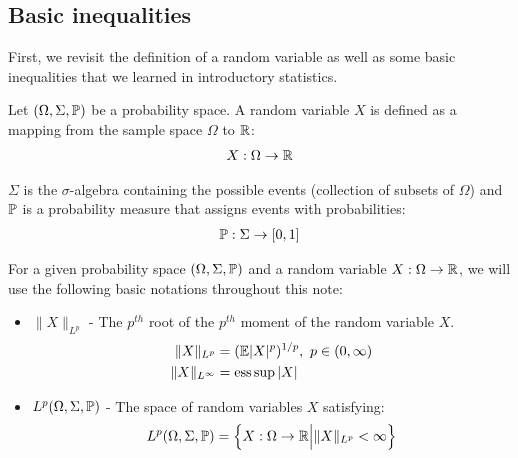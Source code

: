 \subsection{Basic inequalities}
First, we revisit the definition of a random variable as well as some basic inequalities that we
learned in introductory statistics.

\begin{definition}
    Let $(\Omega, \Sigma, \mathbb{P})$ be a probability space. A random variable $X$ is defined as a mapping from the sample space $\Omega$ to $\mathbb{R}$:
    \begin{align}
        X:\Omega \to \mathbb{R}
    \end{align}

    \noindent $\Sigma$ is the $\sigma$-algebra containing the possible events (collection of subsets of $\Omega$) and $\mathbb{P}$ is a probability measure that assigns events with probabilities:
    \begin{align}
        \mathbb{P}: \Sigma \to [0,1]
    \end{align}
\end{definition}

\noindent For a given probability space $(\Omega, \Sigma, \mathbb{P})$ and a random variable $X:\Omega\to\mathbb{R}$, we will use the following basic notations throughout this note:
\begin{itemize}
    \item $\|X\|_{L^p}$ - The $p^{th}$ root of the $p^{th}$ moment of the random variable $X$.
    \begin{align}
        \|X\|_{L^p} &= (\mathbb{E}|X|^p)^{1/p}, \ p \in (0,\infty) \\
        \|X\|_{L^\infty} &= \operatorname*{ess\,sup} |X|
    \end{align}

    \item $L^p(\Omega, \Sigma, \mathbb{P})$ -  The space of random variables $X$ satisfying:
    \begin{align}
        L^p(\Omega, \Sigma, \mathbb{P}) = \Big\{ 
            X : \Omega\to\mathbb{R} \Big| \|X\|_{L^p} < \infty
         \Big\}
    \end{align}
\end{itemize}

